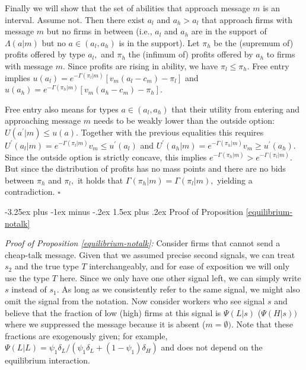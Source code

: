 \documentclass[12pt]{article}
\makeatletter
\renewcommand{\subsection}{%
  \@startsection{subsection}{2}{\z@}%
  {-3.25ex plus -1ex minus -.2ex}%
  {1.5ex plus .2ex}%
  {\normalfont\large\bfseries}%
}
\makeatother
\begin{document}
Finally we will show that the set of abilities that approach message $m$ is
an interval. Assume not. Then there exist $a_{l}$ and $a_{h}>a_{l}$ that
approach firms with message $m$ but no firms in between (i.e., $a_{l}$ and $%
a_{h}$ are in the support of $\Lambda (a|m)$ but no $a\in (a_{l},a_{h})$ is
in the support). Let $\pi _{h}$ be the (supremum of) profits offered by type 
$a_{l},$ and $\pi _{h}$ the (infimum of) profits offered by $a_{h}$ to firms
with message $m.$ Since profits are rising in ability, we have $\pi _{l}\leq
\pi _{h}.$ Free entry implies $u(a_{l})=e^{-\Gamma (\pi _{l}|m)}\left[
v_{m}(a_{l}-c_{m})-\pi _{l}\right] $ and $u(a_{h})=e^{-\Gamma (\pi _{h}|m)}%
\left[ v_{m}(a_{h}-c_{m})-\pi _{h}\right] .$

Free entry also means for types $a\in (a_{l},a_{h})$ that their utility from
entering and approaching message $m$ needs to be weakly lower than the
outside option: $U(a^{\prime }|m)\leq u(a).$ Together with the previous
equalities this requires $U^{\prime }(a_{l}|m)=e^{-\Gamma (\pi
_{l}|m)}v_{m}\leq u^{\prime }(a_{l})$ and $U^{\prime }(a_{h}|m)=e^{-\Gamma
(\pi _{h}|m)}v_{m}\geq u^{\prime }(a_{h}).$ Since the outside option is
strictly concave, this implies $e^{-\Gamma (\pi _{h}|m)}>e^{-\Gamma (\pi
_{l}|m)}.$ But since the distribution of profits has no mass points and
there are no bids between $\pi _{h}$ and $\pi _{l},$ it holds that $\Gamma
(\pi _{h}|m)=\Gamma (\pi _{l}|m),$ yielding a contradiction. $\square $




\subsection{Proof of Proposition \ref{equilibrium-notalk}}\label{online_app:proof_notalk}

\noindent \textit{Proof of Proposition \ref{equilibrium-notalk}:} Consider firms that
cannot send a cheap-talk message. Given that we assumed precise second
signals, we can treat $s_{2}$ and the true type $T$ interchangeably, and for
ease of exposition we will only use the type $T$ here. Since we only have
one other signal left, we can simply write $s$ instead of $s_{1}.$ As long
as we consistently refer to the same signal, we might also omit the signal
from the notation. Now consider workers who see signal $s$ and believe that
the fraction of low (high) firms at this signal is $\Psi (L|s)$ ($\Psi
(H|s)) $ where we suppressed the message because it is absent ($m=\emptyset
).$ Note that these fractions are exogenously given; for example, $\Psi
(L|L)=\psi _{1}\delta _{L}/(\psi _{1}\delta _{L}+(1-\psi _{1})\delta _{H})$
and does not depend on the equilibrium interaction.
\end{document}
